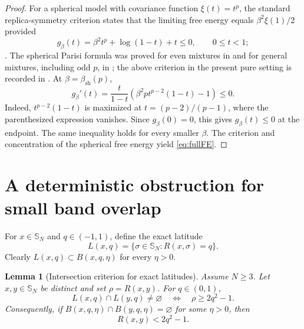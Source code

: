 \documentclass[11pt,reqno]{amsart}
\numberwithin{equation}{section}
\theoremstyle{plain}
\newtheorem{lemma}[lemma]{Lemma}
\theoremstyle{definition}
\theoremstyle{remark}
\newcommand{\SN}{\mathbb{S}_N}
\newcommand{\1}{\mathbf 1}
\begin{document}
\begin{proof}
For a spherical model with covariance function \(\xi(t)=t^p\), the
standard replica-symmetry criterion states that the limiting free
energy equals \(\beta^2\xi(1)/2\) provided
\[
 g_\beta(t)=\beta^2t^p+\log(1-t)+t\leq0,
 \qquad 0\leq t<1;
\].
The spherical Parisi formula was proved for even mixtures in
\cite{Talagrand2006} and for general mixtures, including odd \(p\), in
\cite{Chen2013}; the above criterion in the present pure setting is
recorded in \cite[Equation~(3.8)]{BenArousJagannath2024}.  At
\(\beta=\beta_{\mathrm{sh}}(p)\),
\[
 g_\beta'(t)
 =\frac{t}{1-t}
  \left(\beta^2p t^{p-2}(1-t)-1\right)\leq0.
\]
Indeed, \(t^{p-2}(1-t)\) is maximized at
\(t=(p-2)/(p-1)\), where the parenthesized expression vanishes.
Since \(g_\beta(0)=0\), this gives \(g_\beta(t)\leq0\) at the endpoint.
The same inequality holds for every smaller \(\beta\).  The criterion
and concentration of the spherical free energy yield \eqref{eq:fullFE}.
\end{proof}

\section{A deterministic obstruction for small band overlap}\label{sec:geometry}

For \(x\in\SN\) and \(q\in(-1,1)\), define the exact latitude
\begin{equation}\label{eq:latitude}
 L(x,q)=\{\sigma\in\SN:R(x,\sigma)=q\}.
\end{equation}
Clearly \(L(x,q)\subset B(x,q,\eta)\) for every \(\eta>0\).

\begin{lemma}[Intersection criterion for exact latitudes]\label{lem:latitude}
Assume \(N\geq3\).  Let \(x,y\in\SN\) be distinct and set
\(\rho=R(x,y)\).  For \(q\in(0,1)\),
\begin{equation}\label{eq:latcriterion}
 L(x,q)\cap L(y,q)\neq\varnothing
 \quad\Longleftrightarrow\quad
 \rho\geq 2q^2-1.
\end{equation}
Consequently, if \(B(x,q,\eta)\cap B(y,q,\eta)=\varnothing\) for some \(\eta>0\), then
\begin{equation}\label{eq:centeroverlap}
 R(x,y)<2q^2-1.
\end{equation}
\end{lemma}
\end{document}
